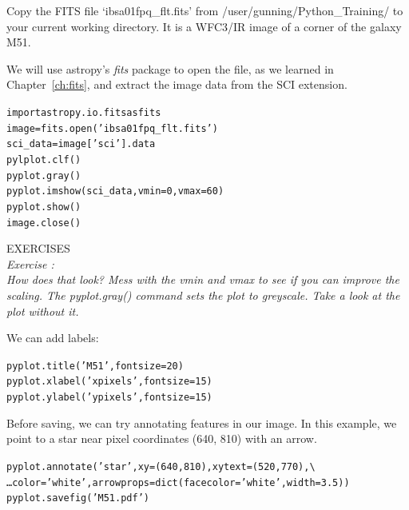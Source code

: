 Copy the FITS file `ibsa01fpq\_flt.fits' from /user/gunning/Python\_Training/ to your current working directory. It
is a WFC3/IR image of a corner of the galaxy M51.

We will use astropy's \textit{fits} package to open the file, as we learned in Chapter~\ref{ch:fits},
and extract the image data from the SCI extension.  

\begin{alltt}
\pytab import astropy.io.fits as fits
\pytab image = fits.open('ibsa01fpq_flt.fits')
\pytab sci_data = image['sci'].data
\pytab pylplot.clf()
\pytab pyplot.gray()
\pytab pyplot.imshow(sci_data, vmin=0, vmax=60)
\pytab pyplot.show()
\pytab image.close()
\end{alltt}

{\color{blue} {\sf\small EXERCISES}} \\
{\it Exercise  :  \\
How does that look? Mess with the \textit{vmin} and \textit{vmax} to see if you can improve the scaling.
The \textit{pyplot.gray()} command sets the plot to greyscale. Take a look at the plot without it.}

We can add labels:  

\begin{alltt}
\pytab pyplot.title('M51', fontsize=20)
\pytab pyplot.xlabel('x pixels', fontsize=15)
\pytab pyplot.ylabel('y pixels', fontsize=15)
\end{alltt}

Before saving, we can try annotating features in our image. In this example,
we point to a star near pixel coordinates (640, 810) with an arrow.

\begin{alltt}
\pytab pyplot.annotate('star', xy=(640,810),  xytext=(520,770), \textbackslash
\ldots color='white', arrowprops=dict(facecolor='white', width=3.5))
\pytab pyplot.savefig('M51.pdf')
\end{alltt}

